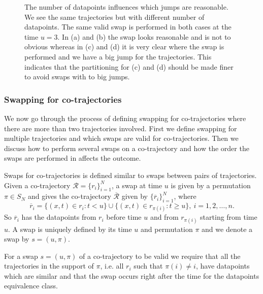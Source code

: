 \documentclass[12pt]{article}
\newcommand{\loc}{x}
\newcommand{\tim}{t}
\newcommand{\traj}{r}
\newcommand{\cotraj}{\mathcal{R}}
\newcommand{\swap}{s}
\newcommand{\swaptime}{u}
\theoremstyle{definition}
\begin{document}
\begin{figure}
\begin{subfigure}[t]{0.45\textwidth}
      \caption{}
      \label{fig:jumps-2b}
    \end{subfigure}
    \caption{The number of datapoints influences which jumps are
      reasonable. We see the same trajectories but with different
      number of datapoints. The same valid swap is performed in both
      cases at the time \(\swaptime = 3\). In (a) and (b) the swap
      looks reasonable and is not to obvious whereas in (c) and (d) it
      is very clear where the swap is performed and we have a big jump
      for the trajectories. This indicates that the partitioning for
      (c) and (d) should be made finer to avoid swaps with to big
      jumps.}
    \label{fig:jumps}
\end{figure}

\subsubsection{Swapping for co-trajectories}
We now go through the process of defining swapping for co-trajectories
where there are more than two trajectories involved. First we define
swapping for multiple trajectories and which swaps are valid for
co-trajectories. Then we discuss how to perform several swaps on a
co-trajectory and how the order the swaps are performed in affects the
outcome.

Swaps for co-trajectories is defined similar to swaps between pairs of
trajectories. Given a co-trajectory
\(\cotraj = \{\traj_{i}\}_{i = 1}^{N}\), a swap at time \(\swaptime\)
is given by a permutation \(\pi \in S_{N}\) and gives the
co-trajectory \(\overline{\cotraj}\) given by
\(\{\overline{\traj}_{i}\}_{i = 1}^{N}\), where
\begin{equation}
  \label{eq:swap-cotrajectory}
  \overline{\traj}_{i} = \{(\loc, \tim) \in \traj_{i}: \tim < \swaptime\} \cup \{(\loc, \tim) \in \traj_{\pi(i)}: \tim \geq \swaptime\},\ i = 1, 2, \dots, n.
\end{equation}
So \(\overline{\traj}_{i}\) has the datapoints from \(\traj_{i}\)
before time \(\swaptime\) and from \(\traj_{\pi(i)}\) starting from
time \(\swaptime\). A swap is uniquely defined by its time \(\swaptime\)
and permutation \(\pi\) and we denote a swap by
\(\swap = (\swaptime, \pi)\).

For a swap \(s = (\swaptime, \pi)\) of a co-trajectory to be valid we
require that all the trajectories in the support of \(\pi\), i.e. all
\(\traj_{i}\) such that \(\pi(i) \not= i\), have datapoints which
are similar and that the swap occurs right after the time for the
datapoints equivalence class.
\end{document}
